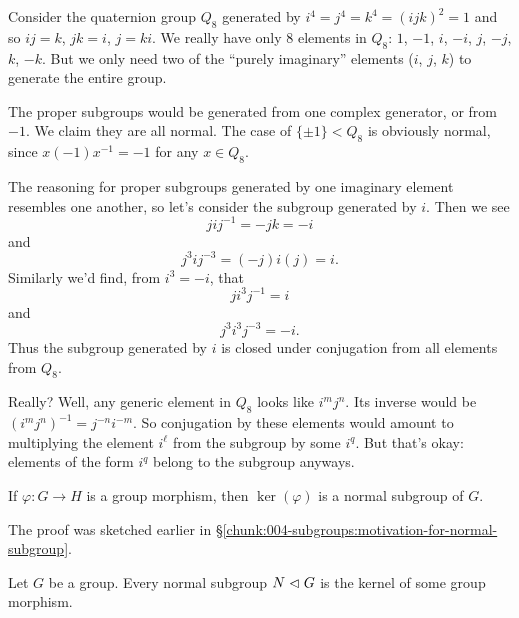 \begin{example}
Consider the quaternion group $Q_{8}$ generated by
$i^{4}=j^{4}=k^{4}=(ijk)^{2}=1$ and %
so $ij=k$, $jk=i$, $j=ki$. We really have only 8 elements in $Q_{8}$:
$1$, $-1$, $i$, $-i$, $j$, $-j$, $k$, $-k$. But we only need two of the
``purely imaginary'' elements ($i$, $j$, $k$) to generate the entire group.

The proper subgroups would be generated from one complex generator, or
from $-1$. We claim they are all normal. The case of $\{\pm1\}<Q_{8}$ is
obviously normal, since $x(-1)x^{-1}=-1$ for any $x\in Q_{8}$.

The reasoning for proper subgroups generated by one imaginary element
resembles one another, so let's consider the subgroup generated by $i$.
Then we see
\begin{equation}
jij^{-1}=-jk=-i
\end{equation}
and 
\begin{equation}
  j^{3}ij^{-3}=(-j)i(j)=i.
\end{equation}
Similarly we'd find, from $i^{3}=-i$, that
\begin{equation}
  ji^{3}j^{-1}=i
\end{equation}
and
\begin{equation}
  j^{3}i^{3}j^{-3}=-i.
\end{equation}
Thus the subgroup generated by $i$ is closed under conjugation from all
elements from $Q_{8}$.

Really? Well, any generic element in $Q_{8}$ looks like
$i^{m}j^{n}$. Its inverse would be $(i^{m}j^{n})^{-1}=j^{-n}i^{-m}$. So
conjugation by these elements would amount to multiplying the element
$i^{\ell}$ from the subgroup by some $i^{q}$. But that's okay: elements
of the form $i^{q}$ belong to the subgroup anyways.
\end{example}

\begin{theorem}
  If $\varphi\colon G\to H$ is a group morphism,
  then $\ker(\varphi)$ is a normal subgroup of $G$.
\end{theorem}

\noindent The proof was sketched earlier in \S\ref{chunk:004-subgroups:motivation-for-normal-subgroup}.

\begin{theorem}
  Let $G$ be a group.
  Every normal subgroup $N\mathrel{\lhd} G$ is the kernel of some group
  morphism. 
\end{theorem}

